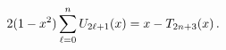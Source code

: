 \[2(1-x^{2})\sum_{\ell=0}^{n}\mathop{U_{2\ell+1}\/}\nolimits\!\left(x\right)=x-%
\mathop{T_{2n+3}\/}\nolimits\!\left(x\right).\]